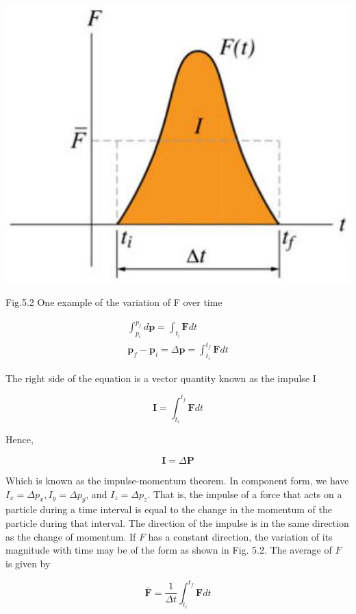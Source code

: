 \documentclass[10pt]{article}
\begin{document}
\begin{center}
\includegraphics[max width=\textwidth]{2024_09_13_db1f357d2aad0a03eb2eg-083(1)}
\end{center}

Fig.5.2 One example of the variation of F over time

$$
\begin{gathered}
\int_{p_{i}}^{p_{f}} d \mathbf{p}=\int_{t_{\mathrm{i}}} \mathbf{F} d t \\
\mathbf{p}_{f}-\mathbf{p}_{i}=\Delta \mathbf{p}=\int_{t_{i}}^{t_{f}} \mathbf{F} d t
\end{gathered}
$$

The right side of the equation is a vector quantity known as the impulse I

$$
\mathbf{I}=\int_{t_{i}}^{t_{f}} \mathbf{F} d t
$$

Hence,

$$
\mathbf{I}=\Delta \mathbf{P}
$$

Which is known as the impulse-momentum theorem. In component form, we have $I_{x}=\Delta p_{x}, I_{y}=\Delta p_{y}$, and $I_{z}=\Delta p_{z}$. That is, the impulse of a force that acts on a particle during a time interval is equal to the change in the momentum of the particle during that interval. The direction of the impulse is in the same direction as the change of momentum. If $F$ has a constant direction, the variation of its magnitude with time may be of the form as shown in Fig. 5.2. The average of $F$ is given by

$$
\overline{\mathbf{F}}=\frac{1}{\Delta t} \int_{t_{i}}^{t_{f}} \mathbf{F} d t
$$
\end{document}
